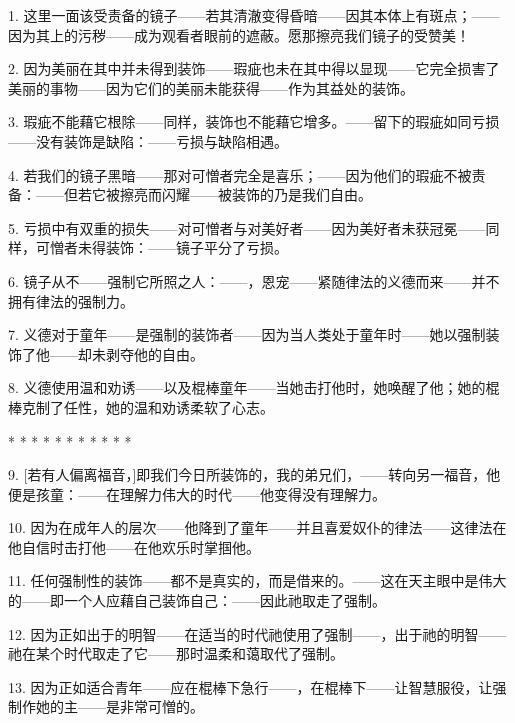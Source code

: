 1. 这里一面该受责备的镜子——若其清澈变得昏暗——因其本体上有斑点；——因为其上的污秽——成为观看者眼前的遮蔽。愿那擦亮我们镜子的受赞美！\par

2. 因为美丽在其中并未得到装饰——瑕疵也未在其中得以显现——它完全损害了美丽的事物——因为它们的美丽未能获得——作为其益处的装饰。\par

3. 瑕疵不能藉它根除——同样，装饰也不能藉它增多。——留下的瑕疵如同亏损——没有装饰是缺陷：——亏损与缺陷相遇。\par

4. 若我们的镜子黑暗——那对可憎者完全是喜乐；——因为他们的瑕疵不被责备：——但若它被擦亮而闪耀——被装饰的乃是我们自由。\par

5. 亏损中有双重的损失——对可憎者与对美好者——因为美好者未获冠冕——同样，可憎者未得装饰：——镜子平分了亏损。\par

6. 镜子从不——强制它所照之人：——，恩宠——紧随律法的义德而来——并不拥有律法的强制力。\par

7. 义德对于童年——是强制的装饰者——因为当人类处于童年时——她以强制装饰了他——却未剥夺他的自由。\par

8. 义德使用温和劝诱——以及棍棒童年——当她击打他时，她唤醒了他；她的棍棒克制了任性，她的温和劝诱柔软了心志。\par

* * * * * * * * * * *\par

9. [若有人偏离福音，]即我们今日所装饰的，我的弟兄们，——转向另一福音，他便是孩童：——在理解力伟大的时代——他变得没有理解力。\par

10. 因为在成年人的层次——他降到了童年——并且喜爱奴仆的律法——这律法在他自信时击打他——在他欢乐时掌掴他。\par

11. 任何强制性的装饰——都不是真实的，而是借来的。——这在天主眼中是伟大的——即一个人应藉自己装饰自己：——因此祂取走了强制。\par

12. 因为正如出于的明智——在适当的时代祂使用了强制——，出于祂的明智——祂在某个时代取走了它——那时温柔和蔼取代了强制。\par

13. 因为正如适合青年——应在棍棒下急行——，在棍棒下——让智慧服役，让强制作她的主——是非常可憎的。\par

